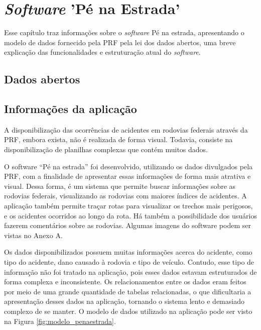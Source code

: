 \chapter{\textit{Software} 'Pé na Estrada'}
  
  Esse capítulo traz informações sobre o \textit{software} Pé na estrada, apresentando o modelo de dados fornecido pela PRF
  pela lei dos dados abertos, uma breve explicação das funcionalidades e estruturação atual do \textit{software}.
  
  \section{Dados abertos}
  
    
  
  \section{Informações da aplicação}
    A disponibilização das ocorrências de acidentes em rodovias federais através da PRF,
    embora exista, não é realizada de forma visual. Todavia, consiste na disponibilização de
    planilhas complexas que contém muitos dados.

    O software “Pé na estrada” foi desenvolvido, utilizando os dados divulgados pela
    PRF, com a finalidade de apresentar essas informações de forma mais atrativa e visual. Dessa
    forma, é um sistema que permite buscar informações sobre as rodovias federais, visualizando
    as rodovias com maiores índices de acidentes. A aplicação também permite traçar rotas para
    visualizar os trechos mais perigosos, e os acidentes ocorridos ao longo da rota. Há também a
    possibilidade dos usuários fazerem comentários sobre as rodovias. Algumas imagens do
    software podem ser vistas no Anexo A.

    Os dados disponibilizados possuem muitas informações acerca do acidente, como tipo
    do acidente, dano causado à rodovia e tipo de veículo. Contudo, esse tipo de informação não
    foi tratado na aplicação, pois esses dados estavam estruturados de forma complexa e
    inconsistente. Os relacionamentos entre os dados eram feitos por meio de uma grande
    quantidade de tabelas relacionadas, o que dificultaria a apresentação desses dados na
    aplicação, tornando o sistema lento e demasiado complexo de se manter. O modelo de dados
    utilizado na aplicação pode ser visto na Figura \ref{fig:modelo_penaestrada}.


